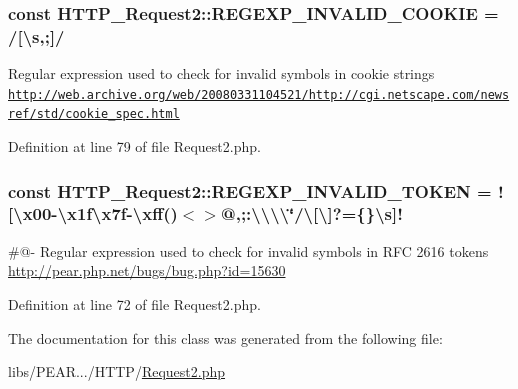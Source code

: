 \subsubsection[{R\+E\+G\+E\+X\+P\+\_\+\+I\+N\+V\+A\+L\+I\+D\+\_\+\+C\+O\+O\+K\+I\+E}]{\setlength{\rightskip}{0pt plus 5cm}const H\+T\+T\+P\+\_\+\+Request2\+::\+R\+E\+G\+E\+X\+P\+\_\+\+I\+N\+V\+A\+L\+I\+D\+\_\+\+C\+O\+O\+K\+I\+E = \textquotesingle{}/\mbox{[}\textbackslash{}s,;\mbox{]}/\textquotesingle{}}\label{classHTTP__Request2_ab7fc574a0035ac8e940f6cd3456b0c28}
Regular expression used to check for invalid symbols in cookie strings \hyperlink{}{\href{http://web.archive.org/web/20080331104521/http://cgi.netscape.com/newsref/std/cookie_spec.html}{\tt http\+://web.\+archive.\+org/web/20080331104521/http\+://cgi.\+netscape.\+com/newsref/std/cookie\+\_\+spec.\+html} }

Definition at line 79 of file Request2.\+php.

\hypertarget{classHTTP__Request2_a73691a6fc7003599b47be20a8c728bbf}{}
\subsubsection[{R\+E\+G\+E\+X\+P\+\_\+\+I\+N\+V\+A\+L\+I\+D\+\_\+\+T\+O\+K\+E\+N}]{\setlength{\rightskip}{0pt plus 5cm}const H\+T\+T\+P\+\_\+\+Request2\+::\+R\+E\+G\+E\+X\+P\+\_\+\+I\+N\+V\+A\+L\+I\+D\+\_\+\+T\+O\+K\+E\+N = \textquotesingle{}!\mbox{[}\textbackslash{}x00-\/\textbackslash{}x1f\textbackslash{}x7f-\/\textbackslash{}xff()$<$$>$@,;\+:\textbackslash{}\textbackslash{}\textbackslash{}\textbackslash{}\char`\"{}/\textbackslash{}\mbox{[}\textbackslash{}\mbox{]}?=\{\}\textbackslash{}s\mbox{]}!\textquotesingle{}}\label{classHTTP__Request2_a73691a6fc7003599b47be20a8c728bbf}
\#@-\/ Regular expression used to check for invalid symbols in R\+F\+C 2616 tokens \hyperlink{}{http\+://pear.\+php.\+net/bugs/bug.\+php?id=15630}

Definition at line 72 of file Request2.\+php.



The documentation for this class was generated from the following file\+:\begin{DoxyCompactItemize}
\item 
libs/\+P\+E\+A\+R.../\+H\+T\+T\+P/\hyperlink{Request2_8php}{Request2.\+php}\end{DoxyCompactItemize}
